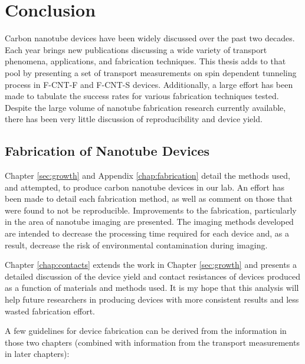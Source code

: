 \chapter{Conclusion}
\label{sec:conclusion}

Carbon nanotube devices have been widely discussed over the past two decades. Each year brings new publications discussing a wide variety of transport phenomena, applications, and fabrication techniques. This thesis adds to that pool by presenting a set of transport measurements on spin dependent tunneling process in F-CNT-F and F-CNT-S devices. Additionally, a large effort has been made to tabulate the success rates for various fabrication techniques tested. Despite the large volume of nanotube fabrication research currently available, there has been very little discussion of reproducibility and device yield. 

\section{Fabrication of Nanotube Devices}

Chapter \ref{sec:growth} and Appendix \ref{chap:fabrication} detail the methods used, and attempted, to produce carbon nanotube devices in our lab. An effort has been made to detail each fabrication method, as well as comment on those that were found to not be reproducible. Improvements to the fabrication, particularly in the area of nanotube imaging are presented. The imaging methods developed are intended to decrease the processing time required for each device and, as a result, decrease the risk of environmental contamination during imaging.

Chapter \ref{chap:contacts} extends the work in Chapter \ref{sec:growth} and presents a detailed discussion of the device yield and contact resistances of devices produced as a function of materials and methods used. It is my hope that this analysis will help future researchers in producing devices with more consistent results and less wasted fabrication effort.

A few guidelines for device fabrication can be derived from the information in those two chapters (combined with information from the transport measurements in later chapters):

